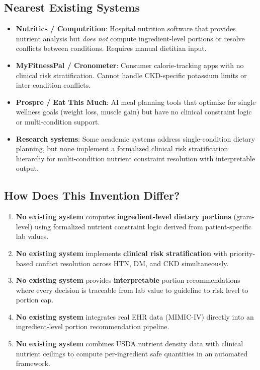 \documentclass[a4paper,12pt]{article}
\begin{document}
\subsection*{Nearest Existing Systems}
\begin{itemize}[itemsep=0.3em]
    \item \textbf{Nutritics / Computrition}: Hospital nutrition software that provides nutrient analysis but \textit{does not} compute ingredient-level portions or resolve conflicts between conditions. Requires manual dietitian input.
    \item \textbf{MyFitnessPal / Cronometer}: Consumer calorie-tracking apps with no clinical risk stratification. Cannot handle CKD-specific potassium limits or inter-condition conflicts.
    \item \textbf{Prospre / Eat This Much}: AI meal planning tools that optimize for single wellness goals (weight loss, muscle gain) but have no clinical constraint logic or multi-condition support.
    \item \textbf{Research systems}: Some academic systems address single-condition dietary planning, but none implement a formalized clinical risk stratification hierarchy for multi-condition nutrient constraint resolution with interpretable output.
\end{itemize}

\subsection*{How Does This Invention Differ?}
\begin{enumerate}[itemsep=0.3em]
    \item \textbf{No existing system} computes \textbf{ingredient-level dietary portions} (gram-level) using formalized nutrient constraint logic derived from patient-specific lab values.
    \item \textbf{No existing system} implements \textbf{clinical risk stratification} with priority-based conflict resolution across HTN, DM, and CKD simultaneously.
    \item \textbf{No existing system} provides \textbf{interpretable} portion recommendations where every decision is traceable from lab value to guideline to risk level to portion cap.
    \item \textbf{No existing system} integrates real EHR data (MIMIC-IV) directly into an ingredient-level portion recommendation pipeline.
    \item \textbf{No existing system} combines USDA nutrient density data with clinical nutrient ceilings to compute per-ingredient safe quantities in an automated framework.
\end{enumerate}
\end{document}
